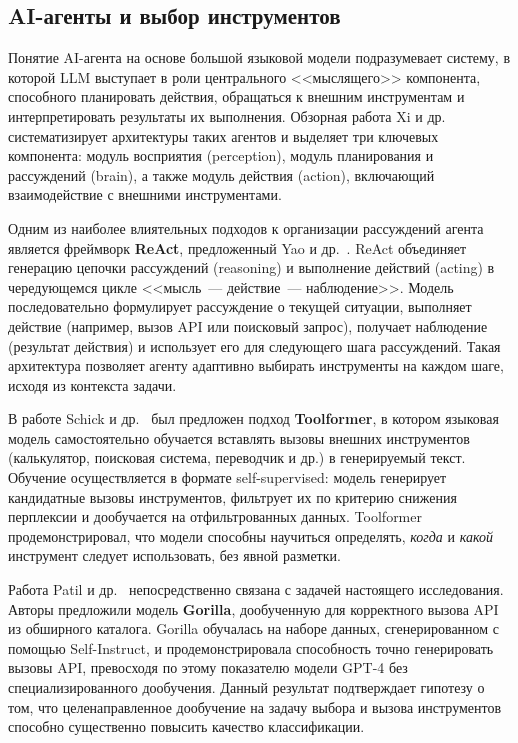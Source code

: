 \subsection{AI-агенты и выбор инструментов}

Понятие AI-агента на основе большой языковой модели подразумевает систему, в которой LLM выступает в роли центрального <<мыслящего>> компонента, способного планировать действия, обращаться к внешним инструментам и интерпретировать результаты их выполнения. Обзорная работа Xi и др.~\cite{xi2023rise} систематизирует архитектуры таких агентов и выделяет три ключевых компонента: модуль восприятия (perception), модуль планирования и рассуждений (brain), а также модуль действия (action), включающий взаимодействие с внешними инструментами.

Одним из наиболее влиятельных подходов к организации рассуждений агента является фреймворк \textbf{ReAct}, предложенный Yao и др.~\cite{yao2023react}. ReAct объединяет генерацию цепочки рассуждений (reasoning) и выполнение действий (acting) в чередующемся цикле <<мысль~--- действие~--- наблюдение>>. Модель последовательно формулирует рассуждение о текущей ситуации, выполняет действие (например, вызов API или поисковый запрос), получает наблюдение (результат действия) и использует его для следующего шага рассуждений. Такая архитектура позволяет агенту адаптивно выбирать инструменты на каждом шаге, исходя из контекста задачи.

В работе Schick и др.~\cite{schick2023toolformer} был предложен подход \textbf{Toolformer}, в котором языковая модель самостоятельно обучается вставлять вызовы внешних инструментов (калькулятор, поисковая система, переводчик и др.) в генерируемый текст. Обучение осуществляется в формате self-supervised: модель генерирует кандидатные вызовы инструментов, фильтрует их по критерию снижения перплексии и дообучается на отфильтрованных данных. Toolformer продемонстрировал, что модели способны научиться определять, \textit{когда} и \textit{какой} инструмент следует использовать, без явной разметки.

Работа Patil и др.~\cite{patil2023gorilla} непосредственно связана с задачей настоящего исследования. Авторы предложили модель \textbf{Gorilla}, дообученную для корректного вызова API из обширного каталога. Gorilla обучалась на наборе данных, сгенерированном с помощью Self-Instruct, и продемонстрировала способность точно генерировать вызовы API, превосходя по этому показателю модели GPT-4 без специализированного дообучения. Данный результат подтверждает гипотезу о том, что целенаправленное дообучение на задачу выбора и вызова инструментов способно существенно повысить качество классификации.

